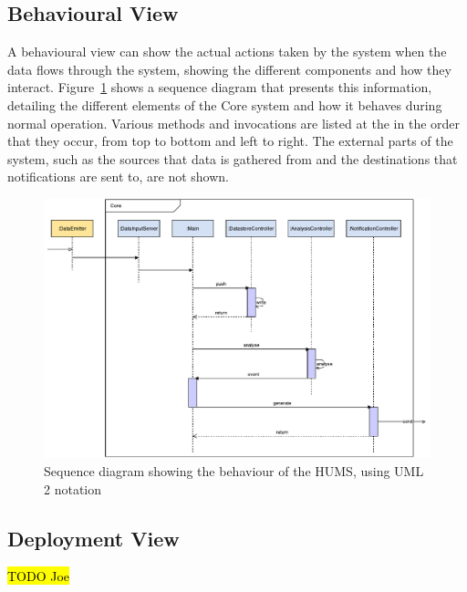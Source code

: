 \documentclass[10pt,a4paper]{article}
\begin{document}
\subsection{Behavioural View}

A behavioural view can show the actual actions taken by the system when the data flows through the system, showing the different components and how they interact. Figure~\ref{fig:sequence} shows a sequence diagram that presents this information, detailing the different elements of the Core system and how it behaves during normal operation. Various methods and invocations are listed at the in the order that they occur, from top to bottom and left to right. The external parts of the system, such as the sources that data is gathered from and the destinations that notifications are sent to, are not shown.

\begin{figure}[tbp]
  \centering
  \includegraphics[width=\textwidth]{images/behaviourView.pdf}
  \caption{Sequence diagram showing the behaviour of the HUMS, using UML 2 notation}
  \label{fig:sequence}
\end{figure}


\subsection{Deployment View}
\hl{TODO Joe}
\end{document}
